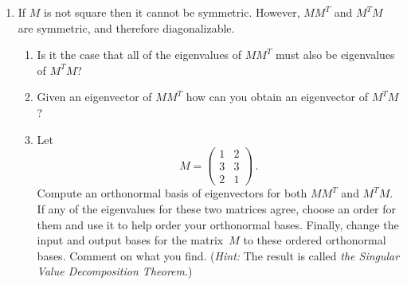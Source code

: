 \begin{enumerate}
\item If $M$ is not square then it cannot be symmetric. However, $MM^T$ and $M^TM$ are symmetric, and therefore diagonalizable. 
\begin{enumerate}
\item Is it the case that all of the eigenvalues of $MM^T$ must also be eigenvalues of $M^TM$? 
\item Given an eigenvector of $MM^T$ how can you obtain an eigenvector of $M^TM$?
\item Let \[M=\begin{pmatrix}1&2\\3&3\\2&1\end{pmatrix}\, .\]
Compute an orthonormal basis of eigenvectors for both $MM^T$ and $M^TM$. If any of the eigenvalues for these two matrices agree,
choose an order for them and use it to help order your orthonormal bases. Finally, change the input and output bases
for the matrix~$M$ to these ordered orthonormal bases. Comment on what you find. ({\itshape Hint:} 
The result is called \emph{the Singular Value Decomposition Theorem}.) 
\end{enumerate}












\end{enumerate}

